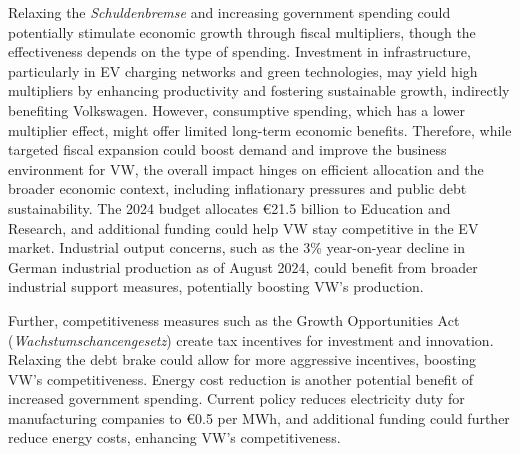 \documentclass[10pt]{article}
\begin{document}


\noindent Relaxing the \textit{Schuldenbremse} and increasing government spending could potentially stimulate economic growth through fiscal multipliers, though the effectiveness depends on the type of spending. Investment in infrastructure, particularly in EV charging networks and green technologies, may yield high multipliers by enhancing productivity and fostering sustainable growth, indirectly benefiting Volkswagen. However, consumptive spending, which has a lower multiplier effect, might offer limited long-term economic benefits. Therefore, while targeted fiscal expansion could boost demand and improve the business environment for VW, the overall impact hinges on efficient allocation and the broader economic context, including inflationary pressures and public debt sustainability. The 2024 budget allocates €21.5 billion to Education and Research, and additional funding could help VW stay competitive in the EV market\autocite{GermanStabilityProgramme}. Industrial output concerns, such as the 3\% year-on-year decline in German industrial production as of August 2024, could benefit from broader industrial support measures, potentially boosting VW's production\autocite{brzeskiReboundGermanIndustrial}.


Further, competitiveness measures such as the Growth Opportunities Act (\textit{Wachstumschancengesetz}) create tax incentives for investment and innovation. Relaxing the debt brake could allow for more aggressive incentives, boosting VW's competitiveness. Energy cost reduction is another potential benefit of increased government spending. Current policy reduces electricity duty for manufacturing companies to €0.5 per MWh, and additional funding could further reduce energy costs, enhancing VW's competitiveness\autocite{GermanStabilityProgramme}.
\end{document}
